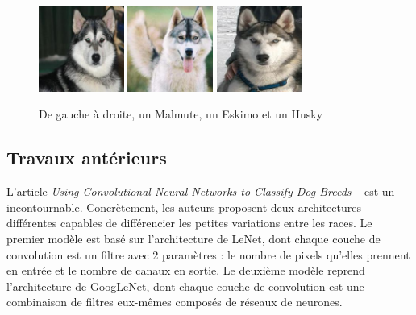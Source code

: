 \documentclass{article}
\begin{document}
\begin{figure}[htbp]
    \centering
    \includegraphics[width=2.8cm]{../dataset/test/n02110063-malamute/n02110063_11838.jpg}\hfill 
    \includegraphics[width=2.8cm]{../dataset/test/n02109961-Eskimo_dog/n02109961_623.jpg}\hfill 
    \includegraphics[width=2.8cm]{../dataset/test/n02110185-Siberian_husky/n02110185_7564.jpg} 
    \caption{De gauche à droite, un Malmute, un Eskimo et un Husky}
    \label{1} 
\end{figure} 

\subsection{Travaux antérieurs}
L'article \textit{Using Convolutional Neural Networks to Classify Dog Breeds}
~\cite{fcdh_FinalReport} est un incontournable. Concrètement, les auteurs
proposent  deux architectures différentes capables de différencier les petites
variations entre les races. Le premier modèle est basé sur l'architecture de LeNet,
dont chaque couche de convolution est un filtre avec 2 paramètres : le nombre de
pixels qu’elles prennent en entrée et le nombre de canaux en sortie. Le deuxième
modèle reprend l'architecture de GoogLeNet, dont chaque couche de convolution
est une combinaison de filtres eux-mêmes composés de réseaux de neurones.
\end{document}
